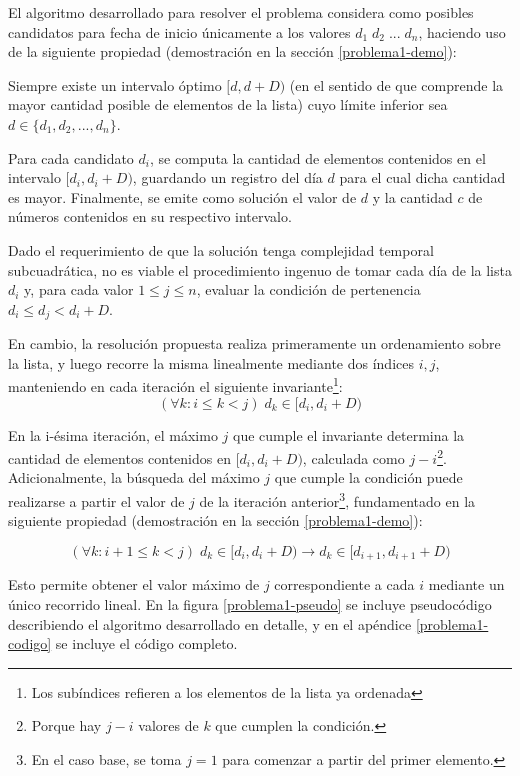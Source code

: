 El algoritmo desarrollado para resolver el problema considera como posibles candidatos para fecha de inicio únicamente a los valores $d_1\;d_2\;...\;d_n$, haciendo uso de la siguiente propiedad (demostración en la sección \ref{problema1-demo}):

\begin{propiedad}\label{propiedad-candidatos}
Siempre existe un intervalo óptimo $[d, d + D)$ (en el sentido de que comprende la mayor cantidad posible de elementos de la lista) cuyo límite inferior sea $d \in \{d_1,d_2,...,d_n\}$.
\end{propiedad}

Para cada candidato $d_i$, se computa la cantidad de elementos contenidos en el intervalo $[d_i, d_i + D)$, guardando un registro del día $d$ para el cual dicha cantidad es mayor. Finalmente, se emite como solución el valor de $d$ y la cantidad $c$ de números contenidos en su respectivo intervalo.

Dado el requerimiento de que la solución tenga complejidad temporal subcuadrática, no es viable el procedimiento ingenuo de tomar cada día de la lista $d_i$ y, para cada valor $1 \leq j \leq n$, evaluar la condición de pertenencia $d_i \leq d_j < d_i + D$.

En cambio, la resolución propuesta realiza primeramente un ordenamiento sobre la lista, y luego recorre la misma linealmente mediante dos índices $i,j$, manteniendo en cada iteración el siguiente invariante\footnote{Los subíndices refieren a los elementos de la lista ya ordenada}:
$$(\forall k: i \leq k < j)\;d_k \in [d_i, d_i + D)$$

En la i-ésima iteración, el máximo $j$ que cumple el invariante determina la cantidad de elementos contenidos en $[d_i, d_i + D)$, calculada como $j - i$\footnote{Porque hay $j - i$ valores de $k$ que cumplen la condición.}. Adicionalmente, la búsqueda del máximo $j$ que cumple la condición puede realizarse a partir el valor de $j$ de la iteración anterior\footnote{En el caso base, se toma $j = 1$ para comenzar a partir del primer elemento.}, fundamentado en la siguiente propiedad (demostración en la sección \ref{problema1-demo}):

\begin{propiedad}\label{propiedad-maximo-j}
$$(\forall k: i + 1 \leq k < j)\;d_k \in [d_i, d_i + D) \rightarrow d_k \in [d_{i+1}, d_{i+1} + D)$$
\end{propiedad}

Esto permite obtener el valor máximo de $j$ correspondiente a cada $i$ mediante un único recorrido lineal. En la figura \ref{problema1-pseudo} se incluye pseudocódigo describiendo el algoritmo desarrollado en detalle, y en el apéndice \ref{problema1-codigo} se incluye el código completo.

